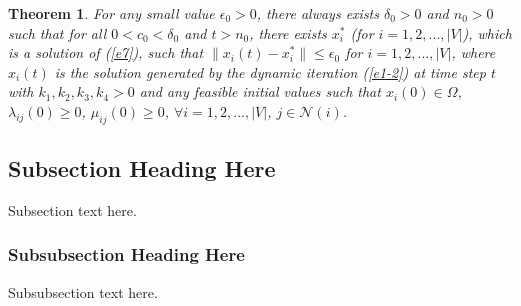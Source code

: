 \documentclass[journal]{IEEEtran}
\newtheorem{theorem}{Theorem}
\begin{document}
\begin{theorem}
For any small value $\epsilon_0>0$, there always exists $\delta_0>0$ and $n_0>0$ such that for all $0<c_0<\delta_0$ and $t>n_0$, there exists $x_i^*$ (for $i=1,2,...,|V|$), which is a solution of (\ref{e7}), such that $\|x_i(t)-x_i^*\|\leq \epsilon_0$ for $i=1,2,...,|V|$, where $x_i(t)$ is the solution generated by the dynamic iteration (\ref{e1-2}) at time step $t$ with $k_1, k_2, k_3, k_4>0$ and any feasible initial values such that $x_i(0)\in \Omega$, $\lambda_{ij}(0)\geq 0$, $\mu_{ij}(0)\geq 0$, $\forall i=1,2,..., |V|$, $j\in\mathcal{N}(i)$.
\end{theorem}
%


\subsection{Subsection Heading Here}
Subsection text here.


\subsubsection{Subsubsection Heading Here}
Subsubsection text here.


%
%
\end{document}

